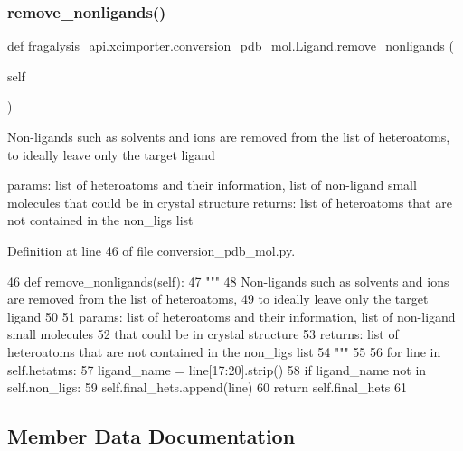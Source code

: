 \subsubsection{\texorpdfstring{remove\+\_\+nonligands()}{remove\_nonligands()}}
{\footnotesize\ttfamily def fragalysis\+\_\+api.\+xcimporter.\+conversion\+\_\+pdb\+\_\+mol.\+Ligand.\+remove\+\_\+nonligands (\begin{DoxyParamCaption}\item[{}]{self }\end{DoxyParamCaption})}

\begin{DoxyVerb}Non-ligands such as solvents and ions are removed from the list of heteroatoms,
to ideally leave only the target ligand

params: list of heteroatoms and their information, list of non-ligand small molecules
    that could be in crystal structure
returns: list of heteroatoms that are not contained in the non_ligs list
\end{DoxyVerb}
 

Definition at line 46 of file conversion\+\_\+pdb\+\_\+mol.\+py.


\begin{DoxyCode}
46     \textcolor{keyword}{def }remove\_nonligands(self):
47         \textcolor{stringliteral}{"""}
48 \textcolor{stringliteral}{        Non-ligands such as solvents and ions are removed from the list of heteroatoms,}
49 \textcolor{stringliteral}{        to ideally leave only the target ligand}
50 \textcolor{stringliteral}{}
51 \textcolor{stringliteral}{        params: list of heteroatoms and their information, list of non-ligand small molecules}
52 \textcolor{stringliteral}{            that could be in crystal structure}
53 \textcolor{stringliteral}{        returns: list of heteroatoms that are not contained in the non\_ligs list}
54 \textcolor{stringliteral}{        """}
55 
56         \textcolor{keywordflow}{for} line \textcolor{keywordflow}{in} self.hetatms:
57             ligand\_name = line[17:20].strip()
58             \textcolor{keywordflow}{if} ligand\_name \textcolor{keywordflow}{not} \textcolor{keywordflow}{in} self.non\_ligs:
59                 self.final\_hets.append(line)
60         \textcolor{keywordflow}{return} self.final\_hets
61 
\end{DoxyCode}


\subsection{Member Data Documentation}
\mbox{\label{classfragalysis__api_1_1xcimporter_1_1conversion__pdb__mol_1_1_ligand_ae95cb0d8d1e5783aa0959ce6fe03256b}} 
